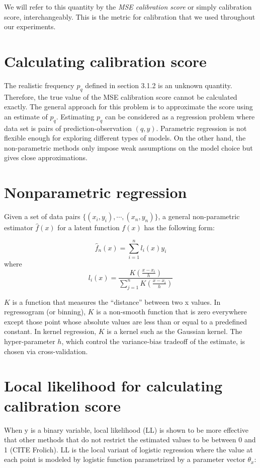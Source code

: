We will refer to this quantity by the \textit{MSE calibration score} or simply calibration score, interchangeably. This is the metric for calibration that we used throughout our experiments.

\section{Calculating calibration score}

The realistic frequency $p_q$ defined in section 3.1.2 is an unknown quantity. Therefore, the true value of the MSE calibration score cannot be calculated exactly. The general approach for this problem is to approximate the score using an estimate of $p_q$. Estimating $p_q$ can be considered as a regression problem where data set is pairs of prediction-observation $(q, y)$. Parametric regression is not flexible enough for exploring different types of models. On the other hand, the non-parametric methods only impose weak assumptions on the model choice but gives close approximations.

\section{Nonparametric regression}

Given a set of data pairs $\{(x_i, y_i), \cdots, (x_n, y_n)\}$, a general non-parametric estimator $\hat{f}(x)$ for a latent function $f(x)$ has the following form:

$$\hat{f}_n(x) = \sum_{i = 1}^{n}l_i(x)y_i$$ where
$$l_i(x) = \frac{K\left(\frac{x - x_i}{h}\right)}{\sum_{j = 1}^{n}K\left(\frac{x - x_i}{h}\right)}$$

$K$ is a function that measures the ``distance'' between two x values. In regressogram (or binning), $K$ is a non-smooth function that is zero everywhere except those point whose absolute values are less than or equal to a predefined constant. In kernel regression, $K$ is a kernel such as the Gaussian kernel. The hyper-parameter $h$, which control the variance-bias tradeoff of the estimate, is chosen via cross-validation.    

\section{Local likelihood for calculating calibration score}

When y is a binary variable, local likelihood (LL) is shown to be more effective that other methods that do not restrict the estimated values to be between 0 and 1 (CITE Frolich). LL is the local variant of logistic regression where the value at each point is modeled by logistic function parametrized by a parameter vector $\theta_x$:

